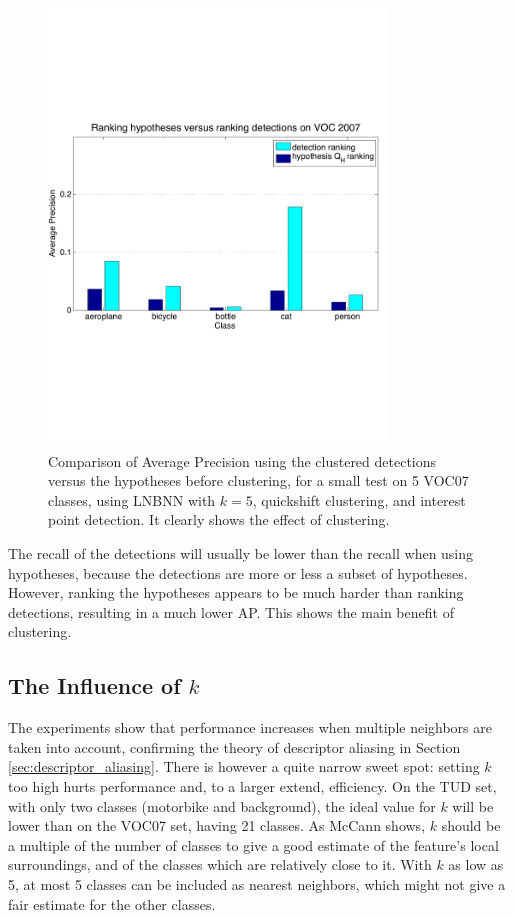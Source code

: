 \begin{figure}[hbt]
    \centering
    \includegraphics[width=0.8\textwidth]{APcomparehypdet}
    \caption{Comparison of Average Precision using the clustered detections versus the hypotheses before clustering, for a small test on 5 VOC07 classes, using LNBNN with $k=5$, quickshift clustering, and interest point detection. It clearly shows the effect of clustering.}
    \label{fig:hyprank}
\end{figure}

The recall of the detections will usually be lower than the recall when using hypotheses, because the detections are more or less a subset of hypotheses. However, ranking the hypotheses appears to be much harder than ranking detections, resulting in a much lower AP. This shows the main benefit of clustering.


\subsection{The Influence of $k$} %
\label{sub:the_influence_of_k_}

The experiments show that performance increases when multiple neighbors are taken into account, confirming the theory of descriptor aliasing in Section \ref{sec:descriptor_aliasing}. There is however a quite narrow sweet spot: setting $k$ too high hurts performance and, to a larger extend, efficiency. On the TUD set, with only two classes (motorbike and background), the ideal value for $k$ will be lower than on the VOC07 set, having 21 classes. As McCann \cite{mccann2012local} shows, $k$ should be a multiple of the number of classes to give a good estimate of the feature's local surroundings, and of the classes which are relatively close to it. With $k$ as low as 5, at most 5 classes can be included as nearest neighbors, which might not give a fair estimate for the other classes.

